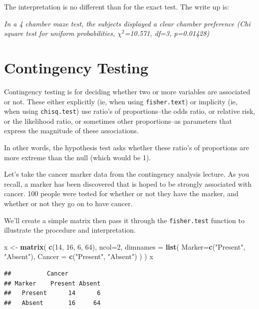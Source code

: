 \documentclass[]{book}
\newenvironment{Shaded}{\begin{snugshade}}{\end{snugshade}}
\newcommand{\DataTypeTok}[1]{\textcolor[rgb]{0.13,0.29,0.53}{#1}}
\newcommand{\DecValTok}[1]{\textcolor[rgb]{0.00,0.00,0.81}{#1}}
\newcommand{\KeywordTok}[1]{\textcolor[rgb]{0.13,0.29,0.53}{\textbf{#1}}}
\newcommand{\NormalTok}[1]{#1}
\newcommand{\StringTok}[1]{\textcolor[rgb]{0.31,0.60,0.02}{#1}}
\begin{document}
The interpretation is no different than for the exact test. The write up is:

\emph{In a 4 chamber maze test, the subjects displayed a clear chamber preference (Chi square test for uniform probabilities, \(\chi^2\)=10.571, df=3, p=0.01428)}

\hypertarget{contingency-testing}{%
\section{Contingency Testing}\label{contingency-testing}}

Contingency testing is for deciding whether two or more variables are associated or not. These either explicitly (ie, when using \texttt{fisher.text}) or implicity (ie, when using \texttt{chisq.test}) use ratio's of proportions--the odds ratio, or relative risk, or the likelihood ratio, or sometimes other proportions--as parameters that express the magnitude of these associations.

In other words, the hypothesis test asks whether these ratio's of proportions are more extreme than the null (which would be 1).

Let's take the cancer marker data from the contingency analysis lecture. As you recall, a marker has been discovered that is hoped to be strongly associated with cancer. 100 people were tested for whether or not they have the marker, and whether or not they go on to have cancer.

We'll create a simple matrix then pass it through the \texttt{fisher.test} function to illustrate the procedure and interpretation.

\begin{Shaded}
\begin{Highlighting}[]
\NormalTok{x <-}\StringTok{ }\KeywordTok{matrix}\NormalTok{(}
  \KeywordTok{c}\NormalTok{(}\DecValTok{14}\NormalTok{, }\DecValTok{16}\NormalTok{, }\DecValTok{6}\NormalTok{, }\DecValTok{64}\NormalTok{), }
  \DataTypeTok{ncol=}\DecValTok{2}\NormalTok{, }
  \DataTypeTok{dimnames =} \KeywordTok{list}\NormalTok{(}
    \DataTypeTok{Marker=}\KeywordTok{c}\NormalTok{(}\StringTok{"Present"}\NormalTok{, }\StringTok{"Absent"}\NormalTok{), }
    \DataTypeTok{Cancer =} \KeywordTok{c}\NormalTok{(}\StringTok{"Present"}\NormalTok{, }\StringTok{"Absent"}\NormalTok{)}
\NormalTok{    )}
\NormalTok{  )}
\NormalTok{x}
\end{Highlighting}
\end{Shaded}

\begin{verbatim}
##          Cancer
## Marker    Present Absent
##   Present      14      6
##   Absent       16     64
\end{verbatim}
\end{document}
